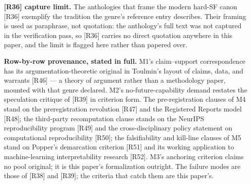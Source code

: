 \documentclass[11pt,a4paper]{article}
\begin{document}
\textbf{[R36] capture limit.} The anthologies that frame the modern hard-SF canon [R36] exemplify the tradition the genre's reference entry describes. Their framing is used as paraphrase, not quotation: the anthology's full text was not captured in the verification pass, so [R36] carries no direct quotation anywhere in this paper, and the limit is flagged here rather than papered over.

\textbf{Row-by-row provenance, stated in full.} M1's claim–support correspondence has its argumentation-theoretic original in Toulmin's layout of claims, data, and warrants [R46] — a theory of argument rather than a methodology paper, mounted with that genre declared. M2's no-future-capability demand restates the speculation critique of [R39] in criterion form. The pre-registration clauses of M4 stand on the preregistration revolution [R47] and the Registered Reports model [R48]; the third-party recomputation clause stands on the NeurIPS reproducibility program [R49] and the cross-disciplinary policy statement on computational reproducibility [R50]; the falsifiability and kill-line clauses of M5 stand on Popper's demarcation criterion [R51] and its working application to machine-learning interpretability research [R52]. M3's anchoring criterion claims no pool original; it is this paper's formalization outright. The failure modes are those of [R38] and [R39]; the criteria that catch them are this paper's.
\end{document}
